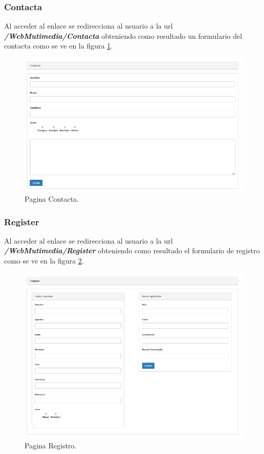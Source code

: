 \subsubsection*{Contacta}
Al acceder al enlace se redirecciona al usuario a la url \textbf{\textit{/WebMutimedia/Contacta}} obteniendo como resultado un formulario del contacta como se ve en la figura \ref{fig:Form_Contacta}.
\begin{figure}[!h]
\begin{center}
   \includegraphics[width=0.7\linewidth]{Figures/Contacta}
  \decoRule
  \caption[Pagina Contacta]{Pagina Contacta.}
\label{fig:Form_Contacta}
\end{center}
\end{figure}
\subsubsection*{Register}
Al acceder al enlace se redirecciona al usuario a la url \textbf{\textit{/WebMutimedia/Register}} obteniendo como resultado el formulario de registro como se ve en la figura \ref{fig:Form_Register}.
\begin{figure}[!h]
\begin{center}
  \includegraphics[width=0.7\linewidth]{Figures/Register}
  \decoRule
  \caption[Pagina Registro]{Pagina Registro.}
\label{fig:Form_Register}
\end{center}
\end{figure}
